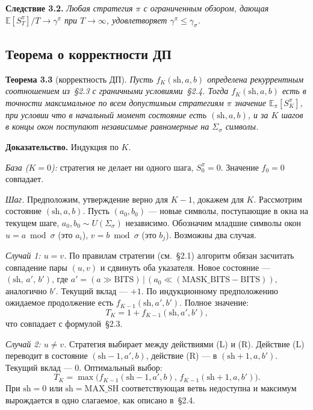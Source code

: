 \textbf{Следствие 3.2.} \emph{Любая стратегия $\pi$ с ограниченным обзором, дающая $\mathbb{E}[S_T^\pi] / T \to \gamma^\pi$ при $T \to \infty$, удовлетворяет $\gamma^\pi \leq \gamma_\sigma$.}

\subsection{Теорема о корректности ДП}

\textbf{Теорема 3.3} (корректность ДП).
\emph{Пусть $f_K(\mathrm{sh}, a, b)$ определена рекуррентным соотношением из~\S2.3 с граничными условиями~\S2.4. Тогда $f_K(\mathrm{sh}, a, b)$ есть в точности максимальное по всем допустимым стратегиям $\pi$ значение $\mathbb{E}_\pi[S_K^\pi]$, при условии что в начальный момент состояние есть $(\mathrm{sh}, a, b)$, и за $K$ шагов в концы окон поступают независимые равномерные на $\Sigma_\sigma$ символы.}

\textbf{Доказательство.} Индукция по $K$.

\emph{База ($K = 0$):} стратегия не делает ни одного шага, $S_0^\pi = 0$. Значение $f_0 = 0$ совпадает.

\emph{Шаг.} Предположим, утверждение верно для $K-1$, докажем для $K$.
Рассмотрим состояние $(\mathrm{sh}, a, b)$. Пусть $(a_0, b_0)$ --- новые символы, поступающие в окна на текущем шаге, $a_0, b_0 \sim U(\Sigma_\sigma)$ независимо. Обозначим младшие символы окон $u = a \bmod \sigma$ (это $a_i$), $v = b \bmod \sigma$ (это $b_j$). Возможны два случая.

\textit{Случай 1: $u = v$.} По правилам стратегии (см.~\S2.1) алгоритм обязан засчитать совпадение пары $(u, v)$ и сдвинуть оба указателя. Новое состояние --- $(\mathrm{sh},\, a',\, b')$, где $a' = (a \gg \mathrm{BITS}) \,|\, (a_0 \ll (\mathrm{MASK\_BITS} - \mathrm{BITS}))$, аналогично $b'$. Текущий вклад --- $+1$. По индукционному предположению ожидаемое продолжение есть $f_{K-1}(\mathrm{sh}, a', b')$. Полное значение:
\[
    T_K = 1 + f_{K-1}(\mathrm{sh}, a', b'),
\]
что совпадает с формулой~\S2.3.

\textit{Случай 2: $u \neq v$.} Стратегия выбирает между действиями (L) и (R). Действие (L) переводит в состояние $(\mathrm{sh}-1, a', b)$, действие (R) --- в $(\mathrm{sh}+1, a, b')$. Текущий вклад --- $0$. Оптимальный выбор:
\[
    T_K = \max\bigl(f_{K-1}(\mathrm{sh}-1, a', b),\, f_{K-1}(\mathrm{sh}+1, a, b')\bigr).
\]
При $\mathrm{sh} = 0$ или $\mathrm{sh} = \mathrm{MAX\_SH}$ соответствующая ветвь недоступна и максимум вырождается в одно слагаемое, как описано в~\S2.4.

